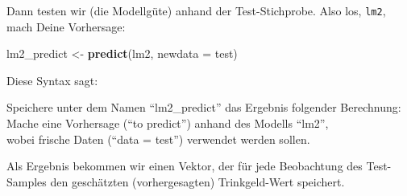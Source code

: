 \documentclass[12pt,]{book}
\newenvironment{Shaded}{\begin{snugshade}}{\end{snugshade}}
\newcommand{\KeywordTok}[1]{\textcolor[rgb]{0.13,0.29,0.53}{\textbf{{#1}}}}
\newcommand{\DataTypeTok}[1]{\textcolor[rgb]{0.13,0.29,0.53}{{#1}}}
\newcommand{\DecValTok}[1]{\textcolor[rgb]{0.00,0.00,0.81}{{#1}}}
\newcommand{\StringTok}[1]{\textcolor[rgb]{0.31,0.60,0.02}{{#1}}}
\newcommand{\CommentTok}[1]{\textcolor[rgb]{0.56,0.35,0.01}{\textit{{#1}}}}
\newcommand{\OtherTok}[1]{\textcolor[rgb]{0.56,0.35,0.01}{{#1}}}
\newcommand{\NormalTok}[1]{{#1}}
\let\BeginKnitrBlock\begin \let\EndKnitrBlock\end
\begin{document}
\begin{Shaded}
\end{Shaded}

Dann testen wir (die Modellgüte) anhand der Test-Stichprobe. Also los,
\texttt{lm2}, mach Deine Vorhersage:

\begin{Shaded}
\begin{Highlighting}[]
\NormalTok{lm2_predict <-}\StringTok{ }\KeywordTok{predict}\NormalTok{(lm2, }\DataTypeTok{newdata =} \NormalTok{test)}
\end{Highlighting}
\end{Shaded}

Diese Syntax sagt:

\BeginKnitrBlock{rmdpseudocode}
Speichere unter dem Namen ``lm2\_predict'' das Ergebnis folgender
Berechnung:\\
Mache eine Vorhersage (``to predict'') anhand des Modells ``lm2'',\\
wobei frische Daten (``data = test'') verwendet werden sollen.
\EndKnitrBlock{rmdpseudocode}

Als Ergebnis bekommen wir einen Vektor, der für jede Beobachtung des
Test-Samples den geschätzten (vorhergesagten) Trinkgeld-Wert speichert.

\begin{Shaded}
\end{Shaded}
\end{document}
